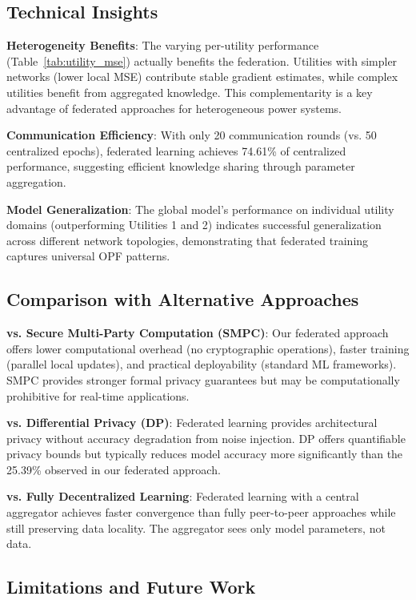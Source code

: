 \documentclass[journal,10pt]{IEEEtran}
\begin{document}
\subsection{Technical Insights}

\textbf{Heterogeneity Benefits}: The varying per-utility performance (Table~\ref{tab:utility_mse}) actually benefits the federation. Utilities with simpler networks (lower local MSE) contribute stable gradient estimates, while complex utilities benefit from aggregated knowledge. This complementarity is a key advantage of federated approaches for heterogeneous power systems.

\textbf{Communication Efficiency}: With only 20 communication rounds (vs. 50 centralized epochs), federated learning achieves 74.61\% of centralized performance, suggesting efficient knowledge sharing through parameter aggregation.

\textbf{Model Generalization}: The global model's performance on individual utility domains (outperforming Utilities 1 and 2) indicates successful generalization across different network topologies, demonstrating that federated training captures universal OPF patterns.

\subsection{Comparison with Alternative Approaches}

\textbf{vs. Secure Multi-Party Computation (SMPC)}: Our federated approach offers lower computational overhead (no cryptographic operations), faster training (parallel local updates), and practical deployability (standard ML frameworks). SMPC provides stronger formal privacy guarantees but may be computationally prohibitive for real-time applications.

\textbf{vs. Differential Privacy (DP)}: Federated learning provides architectural privacy without accuracy degradation from noise injection. DP offers quantifiable privacy bounds but typically reduces model accuracy more significantly than the 25.39\% observed in our federated approach.

\textbf{vs. Fully Decentralized Learning}: Federated learning with a central aggregator achieves faster convergence than fully peer-to-peer approaches while still preserving data locality. The aggregator sees only model parameters, not data.

\subsection{Limitations and Future Work}
\end{document}
